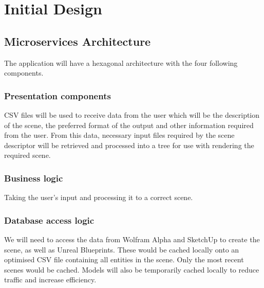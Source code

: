 \documentclass[a4paper,12pt]{article}
\begin{document}



%
%



\newpage
\section{Initial Design}  %

\subsection{Microservices Architecture}
The application will have a hexagonal architecture with the four following components.

\subsubsection{Presentation components}
CSV files will be used to receive data from the user which will be the description of the scene, the preferred format of the output and other information required from the user. From this data, necessary input files required by the scene descriptor will be retrieved and processed into a tree for use with rendering the required scene.

\subsubsection{Business logic}
Taking the user's input and processing it to a correct scene.

\subsubsection{Database access logic}
We will need to access the data from Wolfram Alpha and SketchUp to create the scene, as well as Unreal Blueprints. These would be cached locally onto an optimised CSV file containing all entities in the scene. Only the most recent scenes would be cached. Models will also be temporarily cached locally to reduce traffic and increase efficiency.
\end{document}
